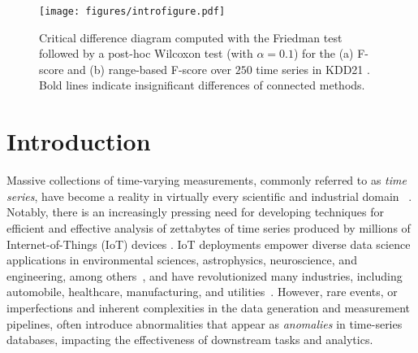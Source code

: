 \begin{figure}
 \centering
 \texttt{[image: figures/introfigure.pdf]}
 \caption{Critical difference diagram computed with the Friedman test followed by a post-hoc Wilcoxon test (with $\alpha=0.1$) for the (a) F-score and (b) range-based F-score over $250$ time series in KDD21 \cite{kdd}. Bold lines indicate insignificant differences of connected methods.}
 \label{fig:introf}
\end{figure}



\section{Introduction}

Massive collections of time-varying measurements, commonly referred to as \textit{time series}, have become a reality in virtually every scientific and industrial domain ~\cite{DBLP:journals/dagstuhl-reports/BagnallCPZ19,Palpanas2019,paparrizos_k-shape_2016,paparrizos2019grail,paparrizos2020debunking,dziedzic2019band,bariya2021k,paparrizos22fast,paparrizos2018fast}. Notably, there is an increasingly pressing need for developing techniques for efficient and effective analysis of zettabytes of time series produced by millions of Internet-of-Things (IoT) devices \cite{iotstats,hung2017leading,paparrizos2021vergedb,jiang2020pids,jiang2021good,liu2021decomposed}. 
IoT deployments empower diverse data science applications in environmental sciences, astrophysics, neuroscience, and engineering, among others~\cite{Palpanas2015,fulfillingtheneed}, and have revolutionized many industries, including automobile, healthcare, manufacturing, and utilities~\cite{ng2017internet}. 
However, rare events, or imperfections and inherent complexities in the data generation and measurement pipelines, often introduce abnormalities that appear as \textit{anomalies} in time-series databases, impacting the effectiveness of downstream tasks and analytics.


